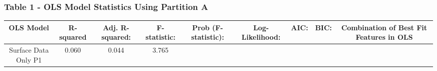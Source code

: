 \documentclass[11pt]{article}
\begin{document}
\subsubsection{Table 1 - OLS Model Statistics Using Partition
A}\label{table-1---ols-model-statistics-using-partition-a}

\begin{longtable}[]{@{}ccccccccc@{}}
\toprule
\begin{minipage}[b]{0.10\columnwidth}\centering\strut
OLS Model\strut
\end{minipage} & \begin{minipage}[b]{0.04\columnwidth}\centering\strut
R-squared\strut
\end{minipage} & \begin{minipage}[b]{0.06\columnwidth}\centering\strut
Adj. R-squared:\strut
\end{minipage} & \begin{minipage}[b]{0.06\columnwidth}\centering\strut
F-statistic:\strut
\end{minipage} & \begin{minipage}[b]{0.08\columnwidth}\centering\strut
Prob (F-statistic):\strut
\end{minipage} & \begin{minipage}[b]{0.06\columnwidth}\centering\strut
Log-Likelihood:\strut
\end{minipage} & \begin{minipage}[b]{0.03\columnwidth}\centering\strut
AIC:\strut
\end{minipage} & \begin{minipage}[b]{0.03\columnwidth}\centering\strut
BIC:\strut
\end{minipage} & \begin{minipage}[b]{0.30\columnwidth}\centering\strut
Combination of Best Fit Features in OLS\strut
\end{minipage}\tabularnewline
\midrule
\endhead
\begin{minipage}[t]{0.10\columnwidth}\centering\strut
Surface Data Only P1\strut
\end{minipage} & \begin{minipage}[t]{0.04\columnwidth}\centering\strut
0.060\strut
\end{minipage} & \begin{minipage}[t]{0.06\columnwidth}\centering\strut
0.044\strut
\end{minipage} & \begin{minipage}[t]{0.06\columnwidth}\centering\strut
3.765\strut
\end{minipage} & \begin{minipage}[t]{0.08\columnwidth}\centering\strut

\end{minipage}
\end{longtable}
\end{document}
